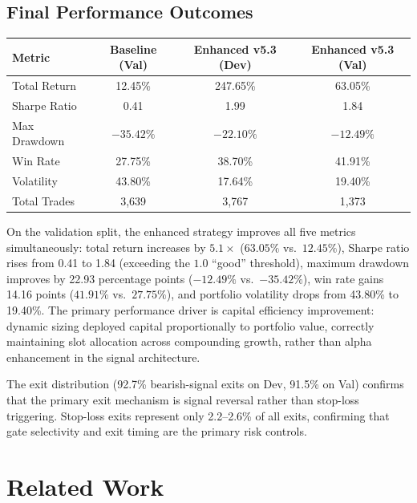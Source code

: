 \documentclass[11pt,twoside,a4paper]{article}
\begin{document}
\subsection{Final Performance Outcomes}

\begin{center}
\begin{tabular}{lccc}
\hline
Metric & Baseline (Val) & Enhanced v5.3 (Dev) & Enhanced v5.3 (Val) \\
\hline
Total Return & 12.45\% & 247.65\% & 63.05\% \\
Sharpe Ratio & 0.41 & 1.99 & 1.84 \\
Max Drawdown & $-35.42\%$ & $-22.10\%$ & $-12.49\%$ \\
Win Rate & 27.75\% & 38.70\% & 41.91\% \\
Volatility & 43.80\% & 17.64\% & 19.40\% \\
Total Trades & 3,639 & 3,767 & 1,373 \\
\hline
\end{tabular}
\end{center}

On the validation split, the enhanced strategy improves all five metrics simultaneously: total return increases by $5.1\times$ ($63.05\%$ vs.\ $12.45\%$), Sharpe ratio rises from 0.41 to 1.84 (exceeding the $1.0$ ``good'' threshold), maximum drawdown improves by 22.93 percentage points ($-12.49\%$ vs.\ $-35.42\%$), win rate gains 14.16 points ($41.91\%$ vs.\ $27.75\%$), and portfolio volatility drops from 43.80\% to 19.40\%. The primary performance driver is capital efficiency improvement: dynamic sizing deployed capital proportionally to portfolio value, correctly maintaining slot allocation across compounding growth, rather than alpha enhancement in the signal architecture.

The exit distribution (92.7\% bearish-signal exits on Dev, 91.5\% on Val) confirms that the primary exit mechanism is signal reversal rather than stop-loss triggering. Stop-loss exits represent only 2.2--2.6\% of all exits, confirming that gate selectivity and exit timing are the primary risk controls.

\clearpage
\section{Related Work}
\end{document}
